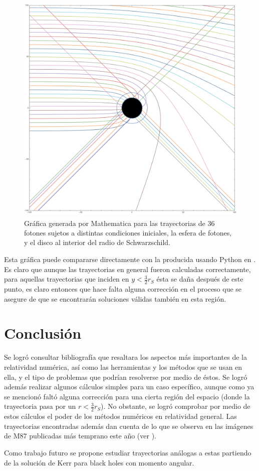 \documentclass[%
 reprint,
 amsmath,amssymb,
 aps,
floatfix,
]{revtex4-1}
\begin{document}
\begin{figure}
    \centering
    \includegraphics[width=\textwidth]{photons.png}
    \caption{Gráfica generada por Mathematica\textsuperscript{\textregistered} para las trayectorias de 36 fotones sujetos a distintas condiciones iniciales, la esfera de fotones, y el disco al interior del radio de Schwarzschild.}
    \label{fig:photons}
\end{figure}
\twocolumngrid

Esta gráfica puede compararse directamente con la producida usando Python en \cite{Nolte2019OrbitingHole}. Es claro que aunque las trayectorias en general fueron calculadas correctamente, para aquellas trayectorias que inciden en $y < \frac{3}{2}r_S$ ésta se daña después de este punto, es claro entonces que hace falta alguna corrección en el proceso que se asegure de que se encontrarán soluciones válidas también en esta región.

\section{Conclusión}

Se logró consultar bibliografía que resaltara los aspectos más importantes de la relatividad numérica, así como las herramientas y los métodos que se usan en ella, y el tipo de problemas que podrían resolverse por medio de éstos. Se logró además realizar algunos cálculos simples para un caso específico, aunque como ya se mencionó faltó alguna corrección para una cierta región del espacio (donde la trayectoria pasa por un $r < \frac{3}{2}r_S$). No obstante, se logró comprobar por medio de estos cálculos el poder de los métodos numéricos en relatividad general. Las trayectorias encontradas además dan cuenta de lo que se observa en las imágenes de M87 publicadas más temprano este año \cite{Akiyama2019FirstRing} (ver \cite{Nolte2019OrbitingHole}).

Como trabajo futuro se propone estudiar trayectorias análogas a estas partiendo de la solución de Kerr para black holes con momento angular.


\end{document}

